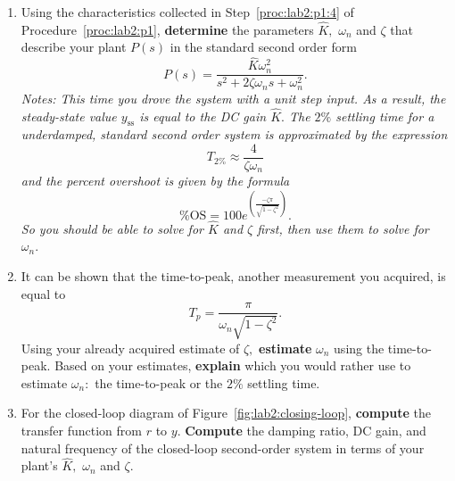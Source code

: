\begin{deliverable}[label={lab2:report}]
  \begin{enumerate}[label={(\arabic*)}]
    \item{
      Using the characteristics collected in Step~\ref{proc:lab2:p1:4} of
      Procedure~\ref{proc:lab2:p1}, \textbf{determine} the parameters
      \(\hat{K},\) \(\omega_n\) and \(\zeta\) that describe your plant \(P(s)\)
      in the standard second order form
      \[
        P(s) = \frac{\hat{K} \omega_n^2}{s^2 + 2 \zeta \omega_n s + \omega_n^2}
        .
      \]
      \emph{Notes: This time you drove the system with a unit
      step input. As a result, the steady-state value \(y_\mathrm{ss}\)
      is equal to the DC gain \(\hat{K}.\) The \(2\%\) settling time for a
      underdamped, standard second order system is approximated by the expression
      \[
        T_{2\%} \approx \frac{4}{\zeta \omega_n}
      \]
      and the percent overshoot is given by the formula
      \[
        \%\mathrm{OS} = 100 e^{\left(
          \frac{-\zeta \pi}{\sqrt{1-\zeta^2}}
        \right)}.
      \]
      So you should be able to solve for \(\hat{K}\) and \(\zeta\) first, then
      use them to solve for \(\omega_n.\)
      }
      \label{lab2:report:q1}
    }
    \item{
      It can be shown that the time-to-peak, another measurement you
      acquired, is equal to
      \[
        T_p = \frac{\pi}{\omega_n \sqrt{1-\zeta^2}}.
      \]
      Using your already acquired estimate of \(\zeta,\) \textbf{estimate}
      \(\omega_n\) using the time-to-peak.
      Based on your estimates, \textbf{explain} which you would rather use to
      estimate \(\omega_n:\) the time-to-peak or the \(2\%\) settling time.
      \label{lab2:report:q2}
    }
    \item{
      For the closed-loop diagram of Figure~\ref{fig:lab2:closing-loop},
      \textbf{compute} the transfer function from \(r\) to \(y.\)
      \textbf{Compute} the damping ratio, DC gain, and natural frequency of the
      closed-loop second-order system in terms of your plant's
      \(\hat{K},\) \(\omega_n\) and \(\zeta.\)
      \label{lab2:report:q3}
    }

\end{enumerate}
\end{deliverable}
